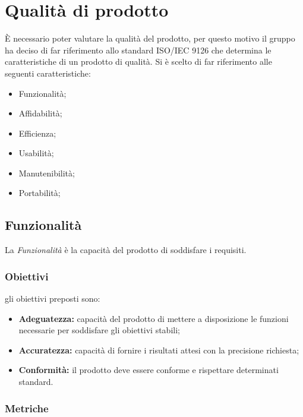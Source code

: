 \section{Qualità di prodotto}
È necessario poter valutare la qualità del prodotto, per questo motivo il gruppo \Omicron{} ha deciso di far riferimento allo standard ISO/IEC 9126 che determina le caratteristiche di un prodotto di qualità. Si è scelto di far riferimento alle seguenti caratteristiche:
\begin {itemize}
	\item{Funzionalità;}
	\item{Affidabilità;}
	\item{Efficienza;}
	\item{Usabilità;}
	\item{Manutenibilità;}
	\item{Portabilità;}
\end{itemize}

\subsection{Funzionalità}
La \textit{Funzionalità} è la capacità del prodotto di soddisfare i requisiti.
\subsubsection{Obiettivi}
gli obiettivi preposti sono:
\begin {itemize}
	\item \textbf{Adeguatezza:} capacità del prodotto di mettere a disposizione le funzioni necessarie per soddisfare gli obiettivi stabili;
	\item \textbf{Accuratezza:} capacità di fornire i risultati attesi con la precisione richiesta;
	\item \textbf{Conformità:} il prodotto deve essere conforme e rispettare determinati standard.
\end{itemize}
\subsubsection{Metriche}
